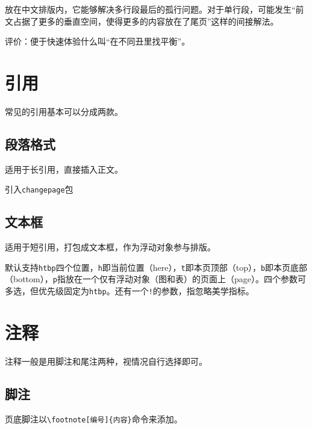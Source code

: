 \documentclass[10pt,openany]{book}
\begin{document}
\begin{sloppypar}
    

    放在中文排版内，它能够解决多行段最后的孤行问题。对于单行段，可能发生“前文占据了更多的垂直空间，使得更多的内容放在了尾页”这样的间接解法。

    评价：便于快速体验什么叫“在不同丑里找平衡”。

    \chapter{引用}

    常见的引用基本可以分成两款。

    \section{段落格式}

    适用于长引用，直接插入正文。

    引入\texttt{changepage}包

    

    \section{文本框}

    适用于短引用，打包成文本框，作为浮动对象参与排版。

    

    默认支持\texttt{htbp}四个位置，\texttt{h}即当前位置（here），\texttt{t}即本页顶部（top），\texttt{b}即本页底部（bottom），\texttt{p}指放在一个仅有浮动对象（图和表）的页面上（page）。四个参数可多选，但优先级固定为\texttt{htbp}。还有一个\texttt{!}的参数，指忽略美学指标。

    \chapter{注释}

    注释一般是用脚注和尾注两种，视情况自行选择即可。

    \section{脚注}

    页底脚注以\texttt{\textbackslash{}footnote{[}编号{]}\{内容\}}命令来添加。

    


\end{sloppypar}
\end{document}
